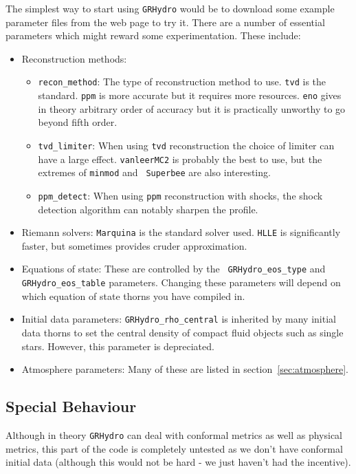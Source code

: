 \documentclass{article}
\begin{document}
The simplest way to start using {\tt GRHydro} would be to download some
example parameter files from the web page to try it. There are a number
of essential parameters which might reward some experimentation. These
include:
\begin{itemize}
\item Reconstruction methods:
  \begin{itemize}
  \item {\tt recon\_method}: The type of reconstruction method to
    use. {\tt tvd} is the standard. {\tt ppm} is more accurate but it requires 
    more resources. {\tt eno} gives in theory
    arbitrary order of accuracy but it is practically unworthy to go beyond fifth order.
  \item {\tt tvd\_limiter}: When using {\tt tvd} reconstruction the
    choice of limiter can have a large effect. {\tt vanleerMC2} is
    probably the best to use, but the extremes of {\tt minmod} and {\tt
      Superbee} are also interesting.
  \item {\tt ppm\_detect}: When using {\tt ppm} reconstruction with
    shocks, the shock detection algorithm can notably sharpen the
    profile.
  \end{itemize}
\item Riemann solvers: {\tt Marquina} is the standard solver
  used. {\tt HLLE} is significantly faster, but sometimes provides cruder approximation.
\item Equations of state: These are controlled by the {\tt
    GRHydro\_eos\_type} and {\tt GRHydro\_eos\_table} parameters. Changing
  these parameters will depend on which equation of state thorns you
  have compiled in.
\item Initial data parameters: {\tt GRHydro\_rho\_central} is inherited by many
  initial data thorns to set the central density of compact fluid
  objects such as single stars. However, this parameter is depreciated.
\item Atmosphere parameters: Many of these are listed in
  section~\ref{sec:atmosphere}. 
\end{itemize}

\subsection{Special Behaviour}

Although in theory {\tt GRHydro} can deal with conformal metrics as well as
physical metrics, this part of the code is completely untested as we
don't have conformal initial data (although this would not be hard -
we just haven't had the incentive).
\end{document}
